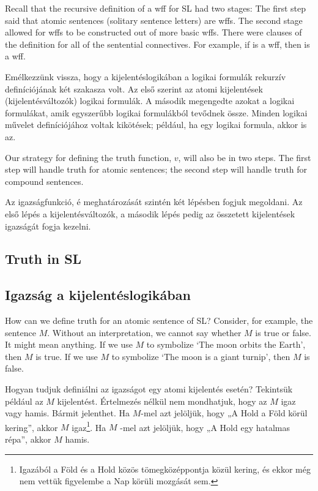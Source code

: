 Recall that the recursive definition of a wff for SL had two stages: The first step said that atomic sentences (solitary sentence letters) are wffs. The second stage allowed for wffs to be constructed out of more basic wffs. There were clauses of the definition for all of the sentential connectives. For example, if  is a wff, then \enot{} is a wff.

Emélkezzünk vissza, hogy a kijelentéslogikában a logikai formulák rekurzív definíciójának két szakasza volt. Az első szerint az atomi kijelentések (kijelentésváltozók) logikai formulák. A második megengedte azokat a logikai formulákat, amik egyszerűbb logikai formulákból tevődnek össze. Minden logikai művelet definíciójához voltak kikötések; például, ha  egy logikai formula, akkor \enot{} is az.

Our strategy for defining the truth function, $v$, will also be in two steps. The first step will handle truth for atomic sentences; the second step will handle truth for compound sentences.

Az igazságfunkció, $é$ meghatározását szintén két lépésben fogjuk megoldani. Az első lépés a kijelentésváltozók, a második lépés pedig az összetett kijelentések igazságát fogja kezelni.



\subsection*{Truth in SL}
\subsection{Igazság a kijelentéslogikában}
How can we define truth for an atomic sentence of SL? Consider, for example, the sentence $M$. Without an interpretation, we cannot say whether $M$ is true or false. It might mean anything. If we use $M$ to symbolize `The moon orbits the Earth', then $M$ is true. If we use $M$ to symbolize `The moon is a giant turnip', then $M$ is false.

Hogyan tudjuk definiálni az igazságot egy atomi kijelentés esetén? Tekintsük például az $M$ kijelentést. Értelmezés nélkül nem mondhatjuk, hogy az $M$ igaz vagy hamis. Bármit jelenthet. Ha $M$-mel azt jelöljük, hogy „A Hold a Föld körül kering”, akkor $M$ igaz\footnote{Igazából a Föld és a Hold közös tömegközéppontja közül kering, és ekkor még nem vettük figyelembe a Nap körüli mozgását sem.}. Ha $M$ -mel azt jelöljük, hogy „A Hold egy hatalmas répa”, akkor $M$ hamis.

